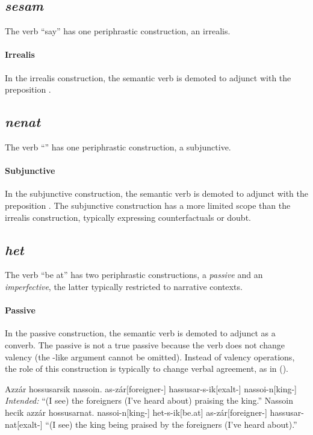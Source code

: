 \subsection{\textit{sesam}}
The verb  “say” has one periphrastic construction, an irrealis.

\paragraph{Irrealis}
In the irrealis construction, the semantic verb is demoted to adjunct with the preposition . 

\subsection{\textit{nenat}}
The verb  “” has one periphrastic construction, a subjunctive.

\paragraph{Subjunctive}
In the subjunctive construction, the semantic verb is demoted to adjunct with the preposition . The subjunctive construction has a more limited scope than the  irrealis construction, typically expressing counterfactuals or doubt.

\subsection{\textit{het}}
The verb  “be at” has two periphrastic constructions, a \emph{passive} and an \emph{imperfective}, the latter typically restricted to narrative contexts.

\paragraph{Passive}
In the passive construction, the semantic verb is demoted to adjunct as a converb. The  passive is not a true passive because the verb does not change valency (\ie the -like argument cannot be omitted). Instead of valency operations, the role of this construction is typically to change verbal agreement, as in (\nextx).

\begin{gloss*}
\a \ljudge{*} \begingl
\glpreamble Azzár hossusarsik nassoin.\endpreamble 
as-zár[foreigner-]
hassusar-s-ik[exalt-]
nassoi-n[king-]
\glft \textit{Intended:} “(I see) the foreigners (I've heard about) praising the king.”
\endgl
\a \begingl
\glpreamble Nassoin hecik azzár hossusarnat.\endpreamble
nassoi-n[king-]
het-s-ik[be.at]
as-zár[foreigner-]
hassusar-nat[exalt-]
\glft “(I see) the king being praised by the foreigners (I've heard about).”
\endgl
\end{gloss*}

